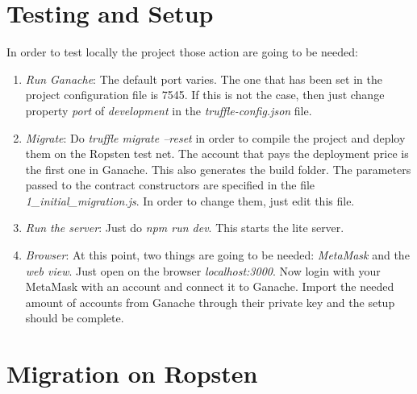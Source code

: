 \documentclass[11pt, a4paper]{report}
\begin{document}
\section*{Testing and Setup}
	In order to test locally the project those action are going to be needed:
	\begin{enumerate}
		\item \emph{Run Ganache}: The default port varies. The one that has been set in the project configuration file is 7545. If this is not the case, then just change property \emph{port} of \emph{development} in the \emph{truffle-config.json} file.
		\item \emph{Migrate}: Do \emph{truffle migrate --reset} in order to compile the project and deploy them on the Ropsten test net. The account that pays the deployment price is the first one in Ganache. This also generates the build folder. The parameters passed to the contract constructors are specified in the file \emph{1\_initial\_migration.js}. In order to change them, just edit this file.
		\item \emph{Run the server}: Just do \emph{npm run dev}. This starts the lite server.
		\item \emph{Browser}: At this point, two things are going to be needed: \emph{MetaMask} and the \emph{web view}. Just open on the browser \emph{localhost:3000}. Now login with your MetaMask with an account and connect it to Ganache. Import the needed amount of accounts from Ganache through their private key and the setup should be complete.
	\end{enumerate}
	
\section*{Migration on Ropsten}
\end{document}
